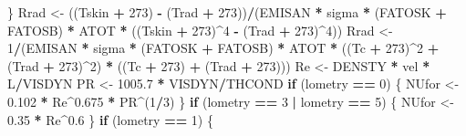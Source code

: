 \documentclass[]{article}
\newenvironment{Shaded}{\begin{snugshade}}{\end{snugshade}}
\newcommand{\DecValTok}[1]{\textcolor[rgb]{0.00,0.00,0.81}{#1}}
\newcommand{\FloatTok}[1]{\textcolor[rgb]{0.00,0.00,0.81}{#1}}
\newcommand{\StringTok}[1]{\textcolor[rgb]{0.31,0.60,0.02}{#1}}
\newcommand{\ControlFlowTok}[1]{\textcolor[rgb]{0.13,0.29,0.53}{\textbf{#1}}}
\newcommand{\OperatorTok}[1]{\textcolor[rgb]{0.81,0.36,0.00}{\textbf{#1}}}
\newcommand{\NormalTok}[1]{#1}
\begin{document}
\begin{Shaded}
\begin{Highlighting}[]
\NormalTok{    \}}
\NormalTok{    Rrad <-}\StringTok{ }\NormalTok{((Tskin }\OperatorTok{+}\StringTok{ }\DecValTok{273}\NormalTok{) }\OperatorTok{-}\StringTok{ }\NormalTok{(Trad }\OperatorTok{+}\StringTok{ }\DecValTok{273}\NormalTok{))}\OperatorTok{/}\NormalTok{(EMISAN }\OperatorTok{*}\StringTok{ }\NormalTok{sigma }\OperatorTok{*}\StringTok{ }
\StringTok{        }\NormalTok{(FATOSK }\OperatorTok{+}\StringTok{ }\NormalTok{FATOSB) }\OperatorTok{*}\StringTok{ }\NormalTok{ATOT }\OperatorTok{*}\StringTok{ }\NormalTok{((Tskin }\OperatorTok{+}\StringTok{ }\DecValTok{273}\NormalTok{)}\OperatorTok{^}\DecValTok{4} \OperatorTok{-}\StringTok{ }\NormalTok{(Trad }\OperatorTok{+}\StringTok{ }
\StringTok{        }\DecValTok{273}\NormalTok{)}\OperatorTok{^}\DecValTok{4}\NormalTok{))}
\NormalTok{    Rrad <-}\StringTok{ }\DecValTok{1}\OperatorTok{/}\NormalTok{(EMISAN }\OperatorTok{*}\StringTok{ }\NormalTok{sigma }\OperatorTok{*}\StringTok{ }\NormalTok{(FATOSK }\OperatorTok{+}\StringTok{ }\NormalTok{FATOSB) }\OperatorTok{*}\StringTok{ }\NormalTok{ATOT }\OperatorTok{*}\StringTok{ }\NormalTok{((Tc }\OperatorTok{+}\StringTok{ }
\StringTok{        }\DecValTok{273}\NormalTok{)}\OperatorTok{^}\DecValTok{2} \OperatorTok{+}\StringTok{ }\NormalTok{(Trad }\OperatorTok{+}\StringTok{ }\DecValTok{273}\NormalTok{)}\OperatorTok{^}\DecValTok{2}\NormalTok{) }\OperatorTok{*}\StringTok{ }\NormalTok{((Tc }\OperatorTok{+}\StringTok{ }\DecValTok{273}\NormalTok{) }\OperatorTok{+}\StringTok{ }\NormalTok{(Trad }\OperatorTok{+}\StringTok{ }\DecValTok{273}\NormalTok{)))}
\NormalTok{    Re <-}\StringTok{ }\NormalTok{DENSTY }\OperatorTok{*}\StringTok{ }\NormalTok{vel }\OperatorTok{*}\StringTok{ }\NormalTok{L}\OperatorTok{/}\NormalTok{VISDYN}
\NormalTok{    PR <-}\StringTok{ }\FloatTok{1005.7} \OperatorTok{*}\StringTok{ }\NormalTok{VISDYN}\OperatorTok{/}\NormalTok{THCOND}
    \ControlFlowTok{if}\NormalTok{ (lometry }\OperatorTok{==}\StringTok{ }\DecValTok{0}\NormalTok{) \{}
\NormalTok{        NUfor <-}\StringTok{ }\FloatTok{0.102} \OperatorTok{*}\StringTok{ }\NormalTok{Re}\OperatorTok{^}\FloatTok{0.675} \OperatorTok{*}\StringTok{ }\NormalTok{PR}\OperatorTok{^}\NormalTok{(}\DecValTok{1}\OperatorTok{/}\DecValTok{3}\NormalTok{)}
\NormalTok{    \}}
    \ControlFlowTok{if}\NormalTok{ (lometry }\OperatorTok{==}\StringTok{ }\DecValTok{3} \OperatorTok{|}\StringTok{ }\NormalTok{lometry }\OperatorTok{==}\StringTok{ }\DecValTok{5}\NormalTok{) \{}
\NormalTok{        NUfor <-}\StringTok{ }\FloatTok{0.35} \OperatorTok{*}\StringTok{ }\NormalTok{Re}\OperatorTok{^}\FloatTok{0.6}
\NormalTok{    \}}
    \ControlFlowTok{if}\NormalTok{ (lometry }\OperatorTok{==}\StringTok{ }\DecValTok{1}\NormalTok{) \{}

\end{Highlighting}
\end{Shaded}
\end{document}
